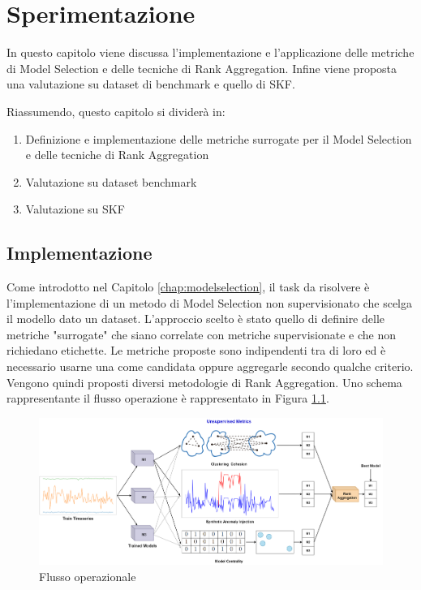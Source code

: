 \chapter{Sperimentazione}
\label{chap:impl}

In questo capitolo viene discussa l'implementazione e l'applicazione delle metriche di Model Selection e delle tecniche di Rank Aggregation. Infine viene proposta una valutazione su dataset di benchmark e quello di SKF.

Riassumendo, questo capitolo si dividerà in:
\begin{enumerate}
	\item Definizione e implementazione delle metriche surrogate per il Model Selection e delle tecniche di Rank Aggregation
	\item Valutazione su dataset benchmark
	\item Valutazione su SKF
\end{enumerate}


\section{Implementazione}
Come introdotto nel Capitolo \ref{chap:modelselection}, il task da risolvere è l'implementazione di un metodo di Model Selection non supervisionato che scelga il modello dato un dataset. L'approccio scelto è stato quello di definire delle metriche "surrogate" che siano correlate con metriche supervisionate e che non richiedano etichette. Le metriche proposte sono indipendenti tra di loro ed è necessario usarne una come candidata oppure aggregarle secondo qualche criterio. Vengono quindi proposti diversi metodologie di Rank Aggregation. Uno schema rappresentante il flusso operazione è rappresentato in Figura \ref{flow-scheme}.
\begin{figure}[t]
	\centering
	\includegraphics[width=14cm, scale=1]{images/model-selection-scheme}
	\caption{Flusso operazionale}
	\label{flow-scheme}
		
\end{figure}

